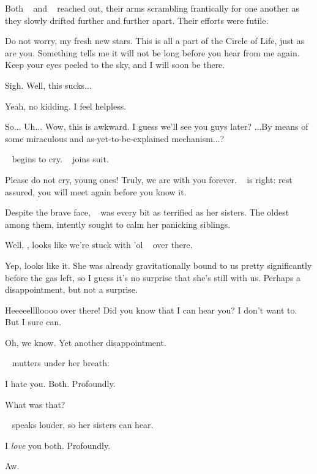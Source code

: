 \documentclass[main.tex]{subfiles}
\begin{document}
\newpara \nar Both \rmsterope~ and \rmelectra~ reached out, their arms scrambling frantically for one another as they slowly drifted further and further apart. Their efforts were futile.

\newpara \Maia Do not worry, my fresh new stars. This is all a part of the Circle of Life, just as are you.  Something tells me it will not be long before you hear from me again. Keep your eyes peeled to the sky, and I will soon be there.  

\newpara \Electra Sigh.  Well, this sucks...

\newpara \Sterope  Yeah, no kidding.   I feel helpless.

\newpara \Electra So... Uh... Wow, this is awkward.  I guess we'll see you guys later?  ...By means of some miraculous and as-yet-to-be-explained mechanism...?

\newpara \nar \rmelectra~ begins to cry.  \rmsterope~ joins suit.

\newpara \Maia Please do not cry, young ones!  Truly, we are with you forever.  \rmelectra~ is right: rest assured, you will meet again before you know it.

\newpara \nar Despite the brave face, \rmmaia~ was every bit as terrified as her sisters.  The oldest among them, \rmmaia intently sought to calm her panicking siblings.

\newpara \Taygete Well, \rmalcyone, looks like we're stuck with 'ol \rmcelaeno~ over there.

\newpara \Alcyone Yep, looks like it.  She was already gravitationally bound to us pretty significantly before the gas left, so I guess it's no surprise that she's still with us.  Perhaps a disappointment, but not a surprise.

\newpara \Celaeno Heeeeelllloooo over there!  Did you know that I can hear you?  I don't want to.  But I sure can.

\newpara \Taygete Oh, we know.  Yet another disappointment.

\newpara \nar \rmcelaeno~ mutters under her breath:

\newpara \Celaeno I hate you.  Both.  Profoundly.

\newpara \Taygete What was that?

\newpara \nar \rmcelaeno~ speaks louder, so her sisters can hear.

\newpara \Celaeno I \textit{love} you both.  Profoundly.

\Alcyone Aw.
\end{document}
